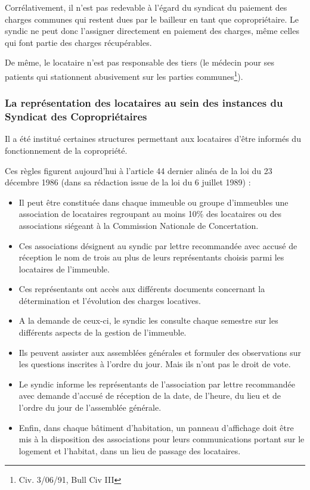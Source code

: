 			Corrélativement, il n'est pas redevable à l'égard du syndicat du paiement des charges communes qui restent dues par le bailleur en tant que copropriétaire. Le syndic ne peut donc l'assigner directement en paiement des charges, même celles qui font partie des charges récupérables.
			
			De même, le locataire n'est pas responsable des tiers (le médecin pour ses patients qui stationnent abusivement sur les parties communes\footnote{Civ. 3/06/91, Bull Civ III }).
		
		\subsubsection{La représentation des locataires au sein des instances du Syndicat des Copropriétaires}
		
		Il a été institué certaines structures permettant aux locataires d'être informés du fonctionnement de la copropriété.
		
		Ces règles figurent aujourd'hui à l'article 44 dernier alinéa de la loi du 23 décembre 1986 (dans sa rédaction issue de la loi du 6 juillet 1989) :
		\begin{itemize}
			\item Il peut être constituée dans chaque immeuble ou groupe d'immeubles une association de locataires regroupant au moins 10\% des locataires ou des associations siégeant à la Commission Nationale de Concertation.	
			\item Ces associations désignent au syndic par lettre recommandée avec accusé de réception le nom de trois au plus de leurs représentants choisis parmi les locataires de l'immeuble.
			\item Ces représentants ont accès aux différents documents concernant la détermination et l'évolution des charges locatives.
			\item A la demande de ceux-ci, le syndic les consulte chaque semestre sur les différents aspects de la gestion de l'immeuble.
			\item Ils peuvent assister aux assemblées générales et formuler des observations sur les questions inscrites à l'ordre du jour. Mais ils n'ont pas le droit de vote.
			\item Le syndic informe les représentants de l'association par lettre recommandée avec demande d'accusé de réception de la date, de l'heure, du lieu et de l'ordre du jour de l'assemblée générale.
			\item Enfin, dans chaque bâtiment d'habitation, un panneau d'affichage doit être mis à la disposition des associations pour leurs communications portant sur le logement et l'habitat, dans un lieu de passage des locataires.
		\end{itemize}
	
